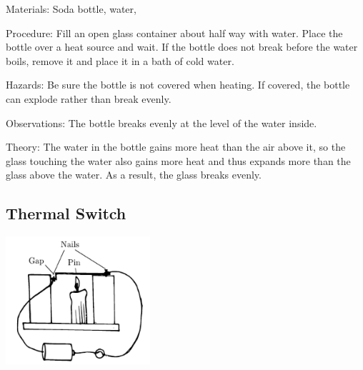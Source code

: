 \begin{multicols}{2}
\begin{description*}
\item[Materials:]{Soda bottle, water, }
\item[Procedure:]{Fill an open glass container about half way with water. Place the bottle over a heat source and wait. If the bottle does not break before the water boils, remove it and place it in a bath of cold water.}
\item[Hazards:]{Be sure the bottle is not covered when heating. If covered, the bottle can explode rather than break evenly.}
\item[Observations:]{The bottle breaks evenly at the level of the water inside.}
\item[Theory:]{The water in the bottle gains more heat than the air above it, so the glass touching the water also gains more heat and thus expands more than the glass above the water. As a result, the glass breaks evenly.}
\end{description*}

\subsection{Thermal Switch}

\begin{center}
\includegraphics[width=0.4\textwidth]{./img/thermal-switch.png}
\end{center}


\end{multicols}
